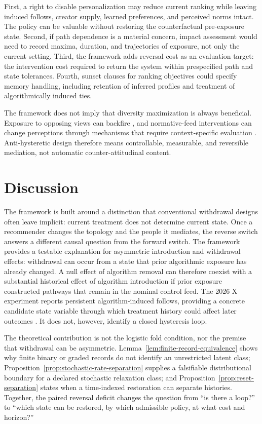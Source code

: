 \documentclass[10pt,a4paper]{article}
\begin{document}
First, a right to disable personalization may reduce current ranking while leaving induced follows, creator supply, learned preferences, and perceived norms intact. The policy can be valuable without restoring the counterfactual pre-exposure state. Second, if path dependence is a material concern, impact assessment would need to record maxima, duration, and trajectories of exposure, not only the current setting. Third, the framework adds reversal cost as an evaluation target: the intervention cost required to return the system within prespecified path and state tolerances. Fourth, sunset clauses for ranking objectives could specify memory handling, including retention of inferred profiles and treatment of algorithmically induced ties.

The framework does not imply that diversity maximization is always beneficial. Exposure to opposing views can backfire \cite{bail2018opposing}, and normative-feed interventions can change perceptions through mechanisms that require context-specific evaluation \cite{brady2026norms}. Anti-hysteretic design therefore means controllable, measurable, and reversible mediation, not automatic counter-attitudinal content.

\section{Discussion}

The framework is built around a distinction that conventional withdrawal designs often leave implicit: current treatment does not determine current state. Once a recommender changes the topology and the people it mediates, the reverse switch answers a different causal question from the forward switch. The framework provides a testable explanation for asymmetric introduction and withdrawal effects: withdrawal can occur from a state that prior algorithmic exposure has already changed. A null effect of algorithm removal can therefore coexist with a substantial historical effect of algorithm introduction if prior exposure constructed pathways that remain in the nominal control feed. The 2026 X experiment reports persistent algorithm-induced follows, providing a concrete candidate state variable through which treatment history could affect later outcomes \cite{gauthier2026x}. It does not, however, identify a closed hysteresis loop.

The theoretical contribution is not the logistic fold condition, nor the premise that withdrawal can be asymmetric. Lemma~\ref{lem:finite-record-equivalence} shows why finite binary or graded records do not identify an unrestricted latent class; Proposition~\ref{prop:stochastic-rate-separation} supplies a falsifiable distributional boundary for a declared stochastic relaxation class; and Proposition~\ref{prop:reset-separation} states when a time-indexed restoration can separate histories. Together, the paired reversal deficit changes the question from ``is there a loop?'' to ``which state can be restored, by which admissible policy, at what cost and horizon?''
\end{document}
